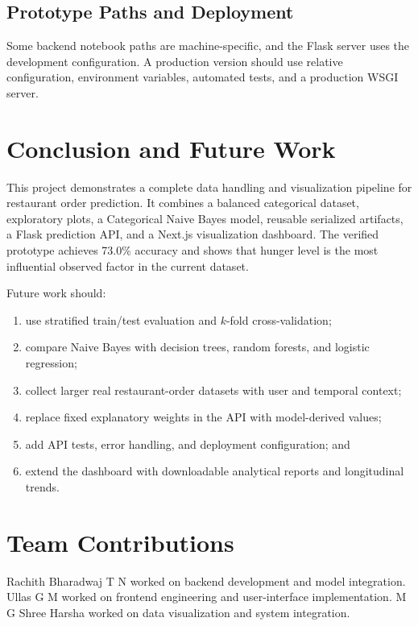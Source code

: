 \documentclass[conference]{IEEEtran}
\begin{document}
\subsection{Prototype Paths and Deployment}

Some backend notebook paths are machine-specific, and the Flask server uses the development configuration. A production version should use relative configuration, environment variables, automated tests, and a production WSGI server.

\section{Conclusion and Future Work}

This project demonstrates a complete data handling and visualization pipeline for restaurant order prediction. It combines a balanced categorical dataset, exploratory plots, a Categorical Naive Bayes model, reusable serialized artifacts, a Flask prediction API, and a Next.js visualization dashboard. The verified prototype achieves 73.0\% accuracy and shows that hunger level is the most influential observed factor in the current dataset.

Future work should:
\begin{enumerate}
    \item use stratified train/test evaluation and $k$-fold cross-validation;
    \item compare Naive Bayes with decision trees, random forests, and logistic regression;
    \item collect larger real restaurant-order datasets with user and temporal context;
    \item replace fixed explanatory weights in the API with model-derived values;
    \item add API tests, error handling, and deployment configuration; and
    \item extend the dashboard with downloadable analytical reports and longitudinal trends.
\end{enumerate}

\section*{Team Contributions}

Rachith Bharadwaj T N worked on backend development and model integration. Ullas G M worked on frontend engineering and user-interface implementation. M G Shree Harsha worked on data visualization and system integration.
\end{document}
